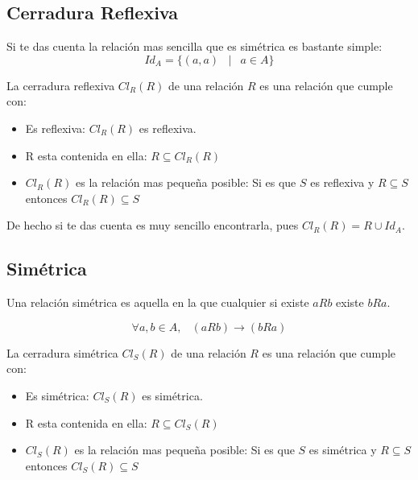 \documentclass[12pt]{report}                                    %
\DeclareMathOperator \Space {\quad}                             %
\DeclareMathOperator \MiniSpace {\;}                            %
\newcommand \Such {\MiniSpace|\MiniSpace}                       %
\begin{document}
        \subsection*{Cerradura Reflexiva}

            Si te das cuenta la relación mas sencilla que es simétrica es bastante simple:
            \begin{equation}
                Id_A = \{ (a, a) \Such a \in A \}
            \end{equation}


            La cerradura reflexiva $Cl_R(R)$ de una relación $R$ es una relación que cumple con:

            \begin{itemize}
                \item Es reflexiva: $Cl_R(R)$ es reflexiva. 
                \item R esta contenida en ella: $R \subseteq Cl_R(R)$
                \item $Cl_R(R)$ es la relación mas pequeña posible: 
                Si es que $S$ es reflexiva y $R \subseteq S$ entonces $Cl_R(R) \subseteq S$
            \end{itemize}



            De hecho si te das cuenta es muy sencillo encontrarla, pues
            $Cl_R(R) = R \cup Id_A$.




        \clearpage
        \subsection{Simétrica}

            Una relación simétrica es aquella en la que cualquier si existe $aRb$ existe $bRa$.

            \begin{equation}
                \forall a,b \in A,\MiniSpace (aRb) \to (bRa)
            \end{equation}


            La cerradura simétrica $Cl_S(R)$ de una relación $R$ es una relación que cumple con:

            \begin{itemize}
                \item Es simétrica: $Cl_S(R)$ es simétrica. 
                \item R esta contenida en ella: $R \subseteq Cl_S(R)$
                \item $Cl_S(R)$ es la relación mas pequeña posible: 
                Si es que $S$ es simétrica y $R \subseteq S$ entonces $Cl_S(R) \subseteq S$
            \end{itemize}
\end{document}
